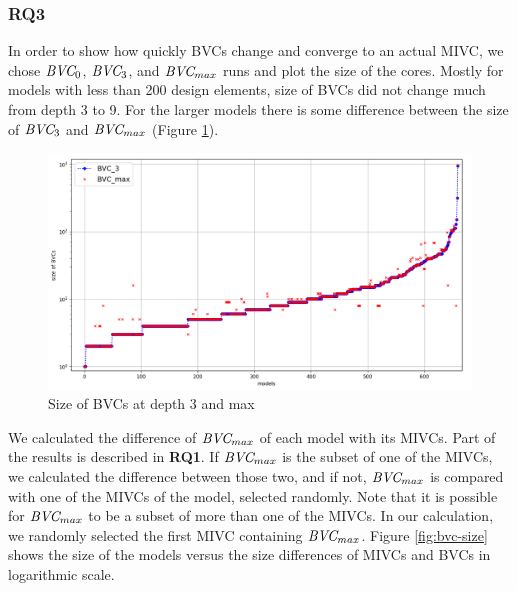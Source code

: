 \vspace{0.1in}
\subsubsection{RQ3}
In order to show how quickly BVCs change and converge to an actual MIVC, we chose $\textit{BVC} _{0}$, $\textit{BVC} _{3}$, and $\textit{BVC} _{max}$  runs and plot the size of the cores. Mostly for models with less than 200 design elements, size of BVCs did not change much from depth 3 to 9. For the larger models there is some difference between the size of $\textit{BVC} _{3}$ and $\textit{BVC} _{max}$ (Figure \ref{fig:bvc-growth}).


 \begin{figure}
 \centering
  \includegraphics[width=.85\columnwidth]{figs/bvcmax.png}
  \caption{Size of BVCs at depth 3 and max}
  \vspace{0.1in}
  \label{fig:bvc-growth}
\end{figure}


We calculated the difference of $\textit{BVC} _{max}$ of each model with its MIVCs. Part of the results is described in \textbf{RQ1}. If $\textit{BVC} _{max}$  is the subset of one of the MIVCs, we calculated the difference between those two, and if not, $\textit{BVC} _{max}$  is compared with one of the MIVCs of the model, selected randomly.  Note that it is possible for $\textit{BVC} _{max}$ to be a subset of more than one of the MIVCs. In our calculation, we randomly selected the first MIVC containing $\textit{BVC} _{max}$.
Figure \ref{fig:bvc-size} shows the size of the models versus the size differences of MIVCs and BVCs
in logarithmic scale.


